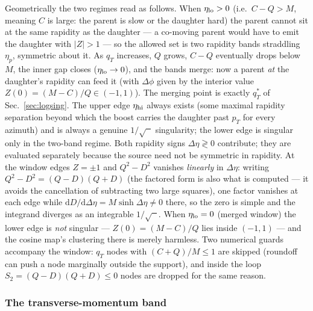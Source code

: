 \documentclass[11pt]{article}
\begin{document}
Geometrically the two regimes read as follows.  When $\eta_{\rm lo}>0$
(i.e.\ $C-Q>M$, meaning $C$ is large: the parent is slow or the daughter
hard) the parent cannot sit at the same rapidity as the daughter --- a
co-moving parent would have to emit the daughter with $|Z|>1$ --- so the
allowed set is two rapidity bands straddling $\eta_p$, symmetric about it.
As $q_T$ increases, $Q$ grows, $C-Q$ eventually drops below $M$, the inner
gap closes ($\eta_{\rm lo}\to0$), and the bands merge: now a parent
\emph{at} the daughter's rapidity can feed it (with $\Delta\phi$ given by
the interior value $Z(0)=(M-C)/Q\in(-1,1)$).  The merging point is exactly
$q_T^{*}$ of Sec.~\ref{sec:logsing}.  The upper edge $\eta_{\rm hi}$ always
exists (some maximal rapidity separation beyond which the boost carries the
daughter past $p_T$ for every azimuth) and is always a genuine
$1/\sqrt{\phantom{x}}$ singularity; the lower edge is singular only in the
two-band regime.
Both rapidity signs $\Delta\eta\gtrless0$ contribute; they are evaluated
separately because the source need not be symmetric in rapidity.  At the
window edges $Z=\pm1$ and $Q^2-D^2$ vanishes \emph{linearly} in
$\Delta\eta$: writing $Q^{2}-D^{2}=(Q-D)(Q+D)$ (the factored form is also
what is computed --- it avoids the cancellation of subtracting two large
squares), one factor vanishes at each edge while
$\mathrm{d}D/\mathrm{d}\Delta\eta=M\sinh\Delta\eta\neq0$ there, so the
zero is simple and the integrand diverges as an integrable
$1/\sqrt{\phantom{x}}$.  When $\eta_{\rm lo}=0$ (merged window) the lower
edge is \emph{not} singular --- $Z(0)=(M-C)/Q$ lies inside $(-1,1)$ ---
and the cosine map's clustering there is merely harmless.  Two numerical
guards accompany the window: $q_T$ nodes with $(C+Q)/M\le1$ are skipped
(roundoff can push a node marginally outside the support), and inside the
loop $S_2=(Q-D)(Q+D)\le0$ nodes are dropped for the same reason.

\subsubsection{The transverse-momentum band}
\label{sec:band}
\end{document}
